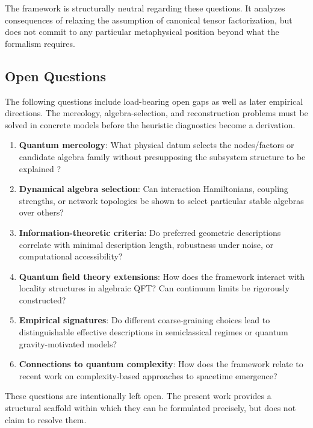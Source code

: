 \documentclass[12pt,a4paper,openany]{book}
\begin{document}
The framework is structurally neutral regarding these questions. It analyzes consequences of relaxing the assumption of canonical tensor factorization, but does not commit to any particular metaphysical position beyond what the formalism requires.

\subsection{Open Questions}

The following questions include load-bearing open gaps as well as later empirical directions.  The mereology, algebra-selection, and reconstruction problems must be solved in concrete models before the heuristic diagnostics become a derivation.

\begin{enumerate}
\item \textbf{Quantum mereology}: What physical datum selects the nodes/factors or candidate algebra family without presupposing the subsystem structure to be explained \cite{Zanardi2004,Cotler2019,CarrollSingh2021}?

\item \textbf{Dynamical algebra selection}: Can interaction Hamiltonians, coupling strengths, or network topologies be shown to select particular stable algebras over others?

\item \textbf{Information-theoretic criteria}: Do preferred geometric descriptions correlate with minimal description length, robustness under noise, or computational accessibility?

\item \textbf{Quantum field theory extensions}: How does the framework interact with locality structures in algebraic QFT? Can continuum limits be rigorously constructed?

\item \textbf{Empirical signatures}: Do different coarse-graining choices lead to distinguishable effective descriptions in semiclassical regimes or quantum gravity-motivated models?

\item \textbf{Connections to quantum complexity}: How does the framework relate to recent work on complexity-based approaches to spacetime emergence?
\end{enumerate}

These questions are intentionally left open. The present work provides a structural scaffold within which they can be formulated precisely, but does not claim to resolve them.
\end{document}
